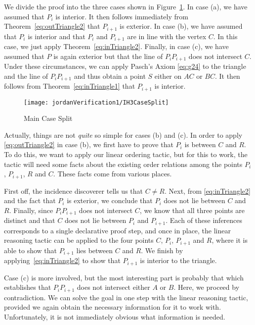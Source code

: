 We divide the proof into the three cases shown in Figure~\ref{fig:IH3CaseSplit}. In case (a), we have assumed that $P_i$ is interior. It then follows immediately from Theorem~\ref{eq:outTriangle2} that $P_{i+1}$ is exterior. In case (b), we have assumed that $P_i$ is interior and that $P_i$ and $P_{i+1}$ are in line with the vertex $C$. In this case, we just apply Theorem~\ref{eq:inTriangle2}. Finally, in case (c), we have assumed that $P$ is again exterior but that the line of $P_iP_{i+1}$ does not intersect $C$. Under these circumstances, we can apply Pasch's Axiom \eqref{eq:g24} to the triangle and the line of $P_iP_{i+1}$ and thus obtain a point $S$ either on $AC$ or $BC$. It then follows from Theorem~\ref{eq:inTriangle1} that $P_{i+1}$ is interior.

\begin{figure}
\centering\texttt{[image: jordanVerification1/IH3CaseSplit]}
\caption{Main Case Split}
\label{fig:IH3CaseSplit}
\end{figure}

Actually, things are not \emph{quite} so simple for cases (b) and (c). In order to apply \eqref{eq:outTriangle2} in case (b), we first have to prove that $P_i$ is between $C$ and $R$. To do this, we want to apply our linear ordering tactic, but for this to work, the tactic will need some facts about the existing order relations among the points $P_i$, $P_{i+1}$, $R$ and $C$. These facts come from various places.

First off, the incidence discoverer tells us that $C \neq R$. Next, from \eqref{eq:inTriangle2} and the fact that $P_i$ is exterior, we conclude that $P_i$ does not lie between $C$ and $R$. Finally, since $P_iP_{i+1}$ does not intersect $C$, we know that all three points are distinct and that $C$ does not lie between $P_i$ and $P_{i+1}$. Each of these inferences corresponds to a single declarative proof step, and once in place, the linear reasoning tactic can be applied to the four points $C$, $P_i$, $P_{i+1}$ and $R$, where it is able to show that $P_{i+1}$ lies between $C$ and $R$. We finish by applying~\eqref{eq:inTriangle2} to show that $P_{i+1}$ is interior to the triangle.

Case (c) is more involved, but the most interesting part is probably that which establishes that $P_iP_{i+1}$ does not intersect either $A$ or $B$. Here, we proceed by contradiction. We can solve the goal in one step with the linear reasoning tactic, provided we again obtain the necessary information for it to work with. Unfortunately, it is not immediately obvious what information is needed.

